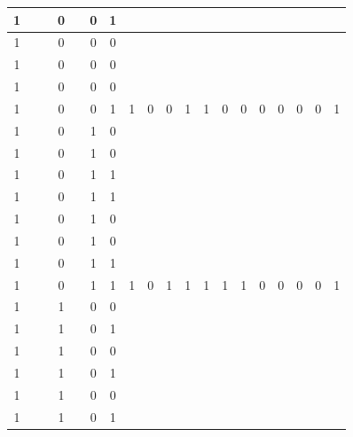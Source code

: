 \begin{table}[!tb]
\begin{tabular}{|c|c|c|c|c|c|c|c|c|c|c|c|c|c|c|c|c|c|c|}
        \rowcolor{yellow!40} 1 &  &  & 0 &  & 0 & 1 &  &  &  &  &  &  &  &  &  &  &  &  \\ \hline
        \rowcolor{yellow!40} 1 &  &  & 0 &  & 0 & 0 &  &  &  &  &  &  &  &  &  &  &  &  \\ \hline
        \rowcolor{yellow!40} 1 &  &  & 0 &  & 0 & 0 &  &  &  &  &  &  &  &  &  &  &  &  \\ \hline
        \rowcolor{yellow!40} 1 &  &  & 0 &  & 0 & 0 &  &  &  &  &  &  &  &  &  &  &  &  \\ \hline
        \rowcolor{yellow!40} 1 &  &  & 0 &  & 0 & 1 & 1 & 0 & 0 & 1 & 1 & 0 & 0 & 0 & 0 & 0 & 0 & 1 \\ \hline
        \rowcolor{gray!40} 1 &  &  & 0 &  & 1 & 0 &  &  &  &  &  &  &  &  &  &  &  &  \\ \hline
        \rowcolor{gray!40} 1 &  &  & 0 &  & 1 & 0 &  &  &  &  &  &  &  &  &  &  &  &  \\ \hline
        \rowcolor{gray!40} 1 &  &  & 0 &  & 1 & 1 &  &  &  &  &  &  &  &  &  &  &  &  \\ \hline
        \rowcolor{gray!40} 1 &  &  & 0 &  & 1 & 1 &  &  &  &  &  &  &  &  &  &  &  &  \\ \hline
        \rowcolor{gray!40} 1 &  &  & 0 &  & 1 & 0 &  &  &  &  &  &  &  &  &  &  &  &  \\ \hline
        \rowcolor{gray!40} 1 &  &  & 0 &  & 1 & 0 &  &  &  &  &  &  &  &  &  &  &  &  \\ \hline
        \rowcolor{gray!40} 1 &  &  & 0 &  & 1 & 1 &  &  &  &  &  &  &  &  &  &  &  &  \\ \hline
        \rowcolor{gray!40} 1 &  &  & 0 &  & 1 & 1 & 1 & 0 & 1 & 1 & 1 & 1 & 1 & 0 & 0 & 0 & 0 & 1 \\ \hline
        \rowcolor{blue!40} 1 &  &  & 1 &  & 0 & 0 &  &  &  &  &  &  &  &  &  &  &  &  \\ \hline
        \rowcolor{blue!40} 1 &  &  & 1 &  & 0 & 1 &  &  &  &  &  &  &  &  &  &  &  &  \\ \hline
        \rowcolor{blue!40} 1 &  &  & 1 &  & 0 & 0 &  &  &  &  &  &  &  &  &  &  &  &  \\ \hline
        \rowcolor{blue!40} 1 &  &  & 1 &  & 0 & 1 &  &  &  &  &  &  &  &  &  &  &  &  \\ \hline
        \rowcolor{blue!40} 1 &  &  & 1 &  & 0 & 0 &  &  &  &  &  &  &  &  &  &  &  &  \\ \hline
        \rowcolor{blue!40} 1 &  &  & 1 &  & 0 & 1 &  &  &  &  &  &  &  &  &  &  &  &  \\ \hline

\end{tabular}
\end{table}
